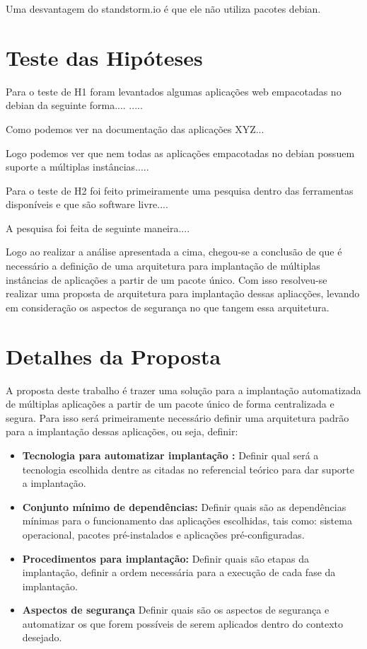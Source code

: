 Uma desvantagem do standstorm.io é que ele não utiliza pacotes debian.


\section{Teste das Hipóteses}


Para o teste de H1 foram levantados algumas aplicações web empacotadas no debian
da seguinte forma....  .....

Como podemos ver na documentação das aplicações XYZ...

Logo podemos ver que nem todas as aplicações empacotadas no debian possuem
suporte a múltiplas instâncias.....


Para o teste de H2 foi feito primeiramente uma pesquisa dentro das ferramentas
disponíveis e que são software livre....

A pesquisa foi feita de seguinte maneira....

Logo ao realizar a análise apresentada a cima, chegou-se a conclusão de que
é necessário a definição de uma arquitetura para implantação de múltiplas
instâncias de aplicações a partir de um pacote único. Com isso resolveu-se
realizar uma proposta de arquitetura para implantação dessas apliacções, levando
em consideração os aspectos de segurança no que tangem essa arquitetura.

\section{Detalhes da Proposta}

A proposta deste trabalho é trazer uma solução para a implantação automatizada
de múltiplas aplicações a partir de um pacote único de forma centralizada e segura.
Para isso será primeiramente necessário definir uma arquitetura padrão para a
implantação dessas aplicações, ou seja, definir:

\begin{itemize}
  \item  \textbf{Tecnologia para automatizar implantação :}  Definir qual será a
  tecnologia escolhida dentre as citadas no referencial teórico para dar suporte
  a implantação.
  \item  \textbf{Conjunto mínimo de dependências:} Definir quais são as dependências
  mínimas para o funcionamento das aplicações escolhidas, tais como: sistema operacional,
  pacotes pré-instalados e aplicações pré-configuradas.
  \item  \textbf{Procedimentos para implantação:} Definir quais são etapas da implantação,
  definir a ordem necessária para a execução de cada fase da implantação.
  \item  \textbf{Aspectos de segurança} Definir quais são os aspectos de segurança
  e automatizar os que forem possíveis de serem aplicados dentro do contexto desejado.
\end{itemize}

